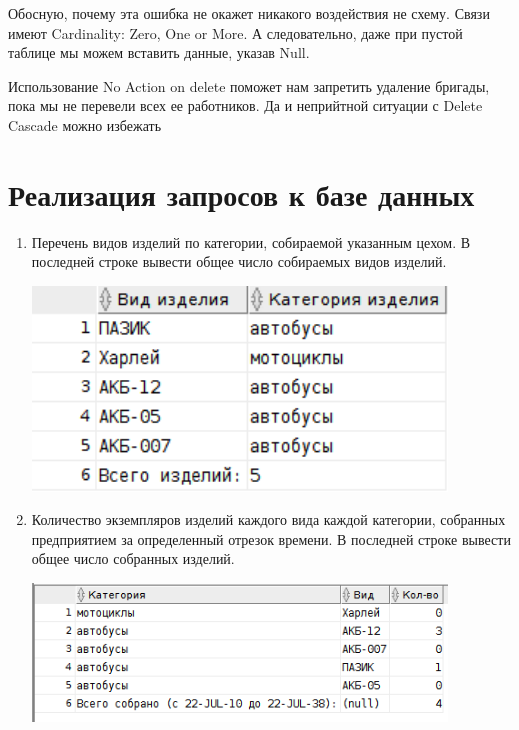 Обосную, почему эта ошибка не окажет никакого воздействия не схему.
Связи имеют Cardinality: Zero, One or More.
А следовательно, даже при пустой таблице мы можем вставить данные, указав Null.

Использование No Action on delete поможет нам запретить удаление бригады, пока мы не перевели всех ее работников.
Да и неприйтной ситуации с Delete Cascade можно избежать

\section{Реализация запросов к базе данных}

\begin{enumerate}

    \item Перечень видов изделий по категории, собираемой указанным цехом.
    В последней строке вывести общее число собираемых видов изделий.

    

    \includegraphics[width=11cm]{./screenshots/results/result1.png}

    \item Количество экземпляров изделий каждого вида каждой категории, собранных предприятием за определенный отрезок времени.
    В последней строке вывести общее число собранных изделий.

    

    \includegraphics[width=11cm]{./screenshots/results/result2.png}


\end{enumerate}
